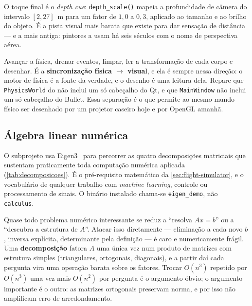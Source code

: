 O toque final é o \emph{depth cue}: \texttt{depth\_scale()} mapeia a
profundidade de câmera do intervalo $[2, 27]$~m para um fator de $1{,}0$ a
$0{,}3$, aplicado ao tamanho e ao brilho do objeto. É a pista visual mais barata
que existe para dar sensação de distância --- e a mais antiga: pintores a usam
há seis séculos com o nome de perspectiva aérea.

\begin{regra}
Avançar a física, drenar eventos, limpar, ler a transformação de cada corpo e
desenhar. É a \textbf{sincronização física $\rightarrow$ visual}, e ela é sempre
nessa direção: o motor de física é a fonte da verdade, e o desenho é uma leitura
dela. Repare que \texttt{PhysicsWorld} do  não inclui um só
cabeçalho do Qt, e que \texttt{MainWindow} não inclui um só cabeçalho do Bullet.
Essa separação é o que permite ao mesmo mundo físico ser desenhado por um
projetor caseiro hoje e por OpenGL amanhã.
\end{regra}

\subsection{Álgebra linear numérica}
\label{sec:calculus}

O subprojeto  usa Eigen3~\cite{eigen} para percorrer as quatro
decomposições matriciais que sustentam praticamente toda computação numérica
aplicada (\cref{tab:decomposicoes}). É o pré-requisito matemático da
\cref{sec:flight-simulator}, e o vocabulário de qualquer trabalho com
\emph{machine learning}, controle ou processamento de sinais. O binário
instalado chama-se \texttt{eigen\_demo}, não \texttt{calculus}.

\begin{porque}
Quase todo problema numérico interessante se reduz a ``resolva $Ax = b$'' ou a
``descubra a estrutura de $A$''. Atacar isso diretamente --- eliminação a cada
novo $b$, inversa explícita, determinante pela definição --- é caro e
numericamente frágil. Uma \textbf{decomposição} fatora $A$ uma única vez num
produto de matrizes com estrutura simples (triangulares, ortogonais, diagonais),
e a partir daí cada pergunta vira uma operação barata sobre os fatores. Trocar
$O(n^3)$ repetido por $O(n^3)$ uma vez mais $O(n^2)$ por pergunta é o
argumento óbvio; o argumento importante é o outro: as matrizes ortogonais
preservam norma, e por isso não amplificam erro de arredondamento.
\end{porque}

